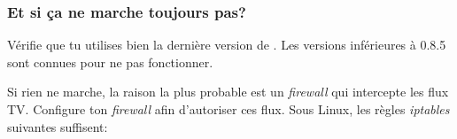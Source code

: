 \subsubsection{Et si ça ne marche toujours pas?}

Vérifie que tu utilises bien la derni\`ere version de . Les versions inférieures à 0.8.5 sont connues pour ne pas fonctionner.

Si rien ne marche, la raison la plus probable est un \emph{firewall} qui intercepte les flux TV. Configure ton \emph{firewall} afin d'autoriser
ces flux. Sous Linux, les r\`egles \emph{iptables} suivantes suffisent:

   
